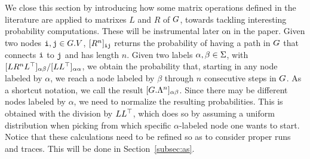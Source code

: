 We close this section by introducing how some  matrix operations defined in the literature \cite{GartnerFW03} are applied to matrixes $L$ and $R$ of $G$, towards tackling interesting probability computations. These will be instrumental later on in the paper. Given two nodes $\textnormal{\texttt{i}},\textnormal{\texttt{j}} \in G.V$, $[R^n]_{\textnormal{\texttt{i}}\textnormal{\texttt{j}}}$ returns the probability of having a path in $G$ that connects $\textnormal{\texttt{i}}$ to $\textnormal{\texttt{j}}$ and has length $n$. Given two labels $\alpha,\beta \in \Sigma$, with $[LR^nL^\top]_{\alpha\beta}/[LL^\top]_{\alpha\alpha}$, we obtain the probability that, starting in any node labeled by $\alpha$, we reach a node labeled by $\beta$ through  $n$ consecutive steps in $G$. As a shortcut notation, we call the result $[G.\Lambda^n]_{\alpha\beta}$. Since there may be different nodes labeled by $\alpha$, we need to normalize the resulting probabilities. This is obtained with the division by $LL^\top$, which does so by assuming a uniform distribution when picking from which specific $\alpha$-labeled node one wants to start. Notice that these calculations need to be refined so as to consider proper runs and  traces. This will be done in Section~\ref{subsec:as}. %



%
%




